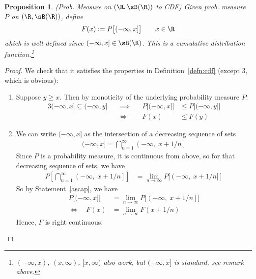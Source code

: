 \documentclass[12pt]{article}
\theoremstyle{plain}
\newtheorem{prop}[thm]{Proposition}
\newtheorem{cor}[thm]{Corollary}
\theoremstyle{definition}
\theoremstyle{remark}
\newcommand{\ninf}{_{n=1}^\infty}
\newcommand{\limn}{\lim_{n\rightarrow\infty}}
\begin{document}
\begin{prop}\emph{(Prob. Measure on $(\R,\sB(\R))$ to CDF)}
Given prob. measure $P$ on $(\R,\sB(\R))$, define
\begin{align*}
  F(x) := P\big[(-\infty,x]\big]
  \qquad x\in\R
\end{align*}
which is well defined since $(-\infty,x]\in\sB(\R)$.
This is a cumulative distribution function.\footnote{%
  $(-\infty,x)$, $(x,\infty)$, $[x,\infty)$ also work, but $(-\infty,x]$
  is standard, see remark above.
}
\end{prop}
\begin{proof}
We check that it satisfies the properties in Definition~\ref{defn:cdf}
(except 3, which is obvious):
\begin{enumerate}
  \item Suppose $y \geq x$. Then by monoticity of the underlying
    probability measure $P$:
    \begin{alignat*}{3}
      (-\infty,x]\subseteq (-\infty,y]
      &\quad\implies\quad
      &P\big[(-\infty,x]\big]
      &\leq
      P\big[(-\infty,y]\big] \\
      &\quad\iff\quad
      &F(x) &\leq F(y)
    \end{alignat*}

  \item We can write $(-\infty,x]$ as the intersection of a decreasing
    sequence of sets
    \begin{align}
      (-\infty,x] = \bigcap\ninf \left(-\infty, \; x+1/n\right]
      \label{ascap}
    \end{align}
    Since $P$ is a probability measure, it is continuous from above,
    so for that decreasing sequence of sets, we have
    \begin{align*}
      P\left[ \bigcap\ninf \left(-\infty, \; x+1/n\right]
      \right]
      &=\limn P\big[ \left(-\infty, \; x+1/n\big]
      \right]
    \end{align*}
    So by Statement~\ref{ascap}, we have
    \begin{align*}
      P\big[(-\infty,x]\big]
      &=\limn P\big[ \left(-\infty, \; x+1/n\right]\big] \\
      \iff \quad
      F(x)
      &=\limn F(x+1/n)
    \end{align*}
    Hence, $F$ is right continuous.
\end{enumerate}
\end{proof}

\end{document}
